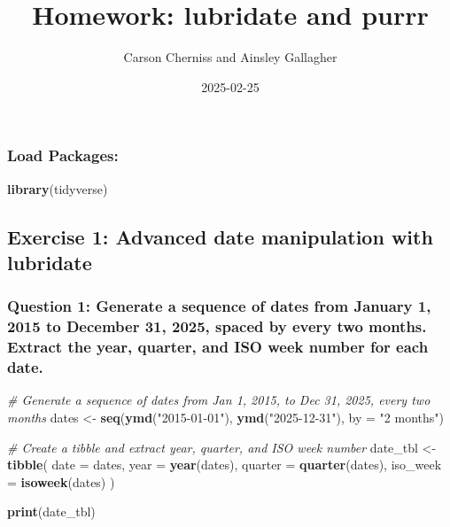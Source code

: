 \documentclass[
]{article}
\title{Homework: lubridate and purrr}
\author{Carson Cherniss and Ainsley Gallagher}
\date{2025-02-25}
\newenvironment{Shaded}{\begin{snugshade}}{\end{snugshade}}
\newcommand{\AttributeTok}[1]{\textcolor[rgb]{0.13,0.29,0.53}{#1}}
\newcommand{\CommentTok}[1]{\textcolor[rgb]{0.56,0.35,0.01}{\textit{#1}}}
\newcommand{\FunctionTok}[1]{\textcolor[rgb]{0.13,0.29,0.53}{\textbf{#1}}}
\newcommand{\NormalTok}[1]{#1}
\newcommand{\OtherTok}[1]{\textcolor[rgb]{0.56,0.35,0.01}{#1}}
\newcommand{\StringTok}[1]{\textcolor[rgb]{0.31,0.60,0.02}{#1}}
\begin{document}
\maketitle

\subsubsection{Load Packages:}\label{load-packages}

\begin{Shaded}
\begin{Highlighting}[]
\FunctionTok{library}\NormalTok{(tidyverse)}
\end{Highlighting}
\end{Shaded}

\subsection{Exercise 1: Advanced date manipulation with
lubridate}\label{exercise-1-advanced-date-manipulation-with-lubridate}

\subsubsection{Question 1: Generate a sequence of dates from January 1,
2015 to December 31, 2025, spaced by every two months. Extract the year,
quarter, and ISO week number for each
date.}\label{question-1-generate-a-sequence-of-dates-from-january-1-2015-to-december-31-2025-spaced-by-every-two-months.-extract-the-year-quarter-and-iso-week-number-for-each-date.}

\begin{Shaded}
\begin{Highlighting}[]
\CommentTok{\# Generate a sequence of dates from Jan 1, 2015, to Dec 31, 2025, every two months}
\NormalTok{dates }\OtherTok{\textless{}{-}} \FunctionTok{seq}\NormalTok{(}\FunctionTok{ymd}\NormalTok{(}\StringTok{"2015{-}01{-}01"}\NormalTok{), }\FunctionTok{ymd}\NormalTok{(}\StringTok{"2025{-}12{-}31"}\NormalTok{), }\AttributeTok{by =} \StringTok{"2 months"}\NormalTok{)}

\CommentTok{\# Create a tibble and extract year, quarter, and ISO week number}
\NormalTok{date\_tbl }\OtherTok{\textless{}{-}} \FunctionTok{tibble}\NormalTok{(}
  \AttributeTok{date =}\NormalTok{ dates,}
  \AttributeTok{year =} \FunctionTok{year}\NormalTok{(dates),}
  \AttributeTok{quarter =} \FunctionTok{quarter}\NormalTok{(dates),}
  \AttributeTok{iso\_week =} \FunctionTok{isoweek}\NormalTok{(dates) }
\NormalTok{)}

\FunctionTok{print}\NormalTok{(date\_tbl)}
\end{Highlighting}
\end{Shaded}
\end{document}
